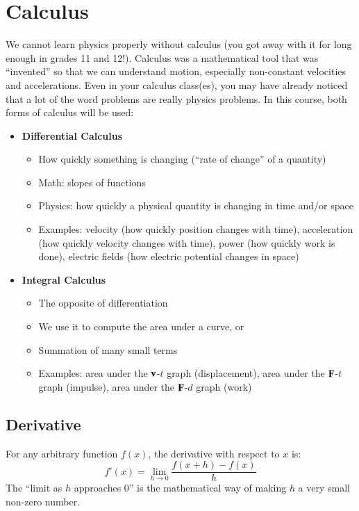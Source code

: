 \documentclass{../../../oss-handout}
\newcommand{\mb}[1]{\ensuremath\mathbf{#1}}
\begin{document}
\section{Calculus}
We cannot learn physics properly without calculus (you got away with it for
long enough in grades 11 and 12!). Calculus was a mathematical tool that was
``invented'' so that we can understand motion, especially non-constant
velocities and accelerations. Even in your calculus class(es), you may have
already noticed that a lot of the word problems  are really physics problems.
In this course, both forms of calculus will be used:
\begin{itemize}[topsep=0pt]
\item\textbf{Differential Calculus}
  \begin{itemize}
  \item How quickly something is changing (``rate of change'' of a quantity)
  \item Math: slopes of functions
  \item Physics: how quickly a physical quantity is changing in time and/or
    space
  \item Examples: velocity (how quickly position changes with time),
    acceleration (how quickly velocity changes with time), power (how quickly
    work is done), electric fields (how electric potential changes in space)
  \end{itemize}
\item\textbf{Integral Calculus}
  \begin{itemize}
  \item The opposite of differentiation
  \item We use it to compute the area under a curve, or
  \item Summation of many small terms
  \item Examples: area under the $\mb{v}$-$t$ graph (displacement), area
    under the $\mb{F}$-$t$ graph (impulse), area under the $\mb{F}$-$d$ graph
    (work)
  \end{itemize}
\end{itemize}


\subsection{Derivative}

For any arbitrary function $f(x)$, the derivative with respect to $x$ is:
\begin{equation*}
  f'(x)=\lim_{h\rightarrow 0}\frac{f(x+h)-f(x)}{h}
\end{equation*}
The ``limit as $h$ approaches $0$'' is the mathematical way of making $h$ a
very small non-zero number.
\end{document}

